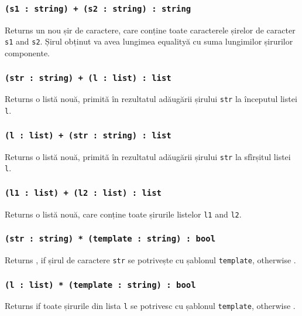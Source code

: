\subsubsection{\texttt{(s1 : string) + (s2 : string) : string}}

Returns un nou șir de caractere, care conține toate caracterele șirelor de caracter \texttt{s1} and \texttt{s2}. Șirul obținut va avea lungimea equalityă cu suma lungimilor șirurilor componente.

\subsubsection{\texttt{(str : string) + (l : list) : list}}

Returns o listă nouă, primită în rezultatul adăugării șirului \texttt{str} la începutul listei \texttt{l}.

\subsubsection{\texttt{(l : list) + (str : string) : list}}

Returns o listă nouă, primită în rezultatul adăugării șirului \texttt{str} la sfîrșitul listei \texttt{l}.

\subsubsection{\texttt{(l1 : list) + (l2 : list) : list}}

Returns o listă nouă, care conține toate șirurile listelor \texttt{l1} and \texttt{l2}.

\subsubsection{\texttt{(str : string) * (template : string) : bool}}

Returns \true{}, if șirul de caractere \texttt{str} se potrivește cu șablonul \texttt{template}, otherwise \false{}.

\subsubsection{\texttt{(l : list) * (template : string) : bool}}

Returns \true{} if toate șirurile din lista \texttt{l} se potrivesc cu șablonul \texttt{template}, otherwise \false{}.

